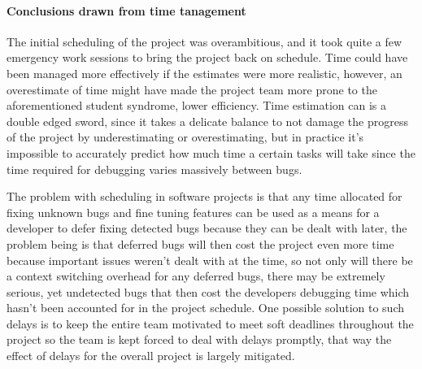 \paragraph{Conclusions drawn from time tanagement}
The initial scheduling of the project was overambitious, and it took quite a few emergency work sessions to bring the project back on schedule. Time could have been managed more effectively if the estimates were more realistic, however, an overestimate of time might have made the project team more prone to the aforementioned student syndrome, lower efficiency. Time estimation can is a double edged sword, since it takes a delicate balance to not damage the progress of the project by underestimating or overestimating, but in practice it's impossible to accurately predict how much time a certain tasks will take since the time required for debugging varies massively between bugs. 

The problem with scheduling in software projects is that any time allocated for fixing unknown bugs and fine tuning features can be used as a means for a developer to defer fixing detected bugs because they can be dealt with later, the problem being is that deferred bugs will then cost the project even more time because important issues weren't dealt with at the time, so not only will there be a context switching overhead for any deferred bugs, there may be extremely serious, yet undetected bugs that then cost the developers debugging time which hasn't been accounted for in the project schedule. One possible solution to such delays is to keep the entire team motivated to meet soft deadlines throughout the project so the team is kept forced to deal with delays promptly, that way the effect of delays for the overall project is largely mitigated. 

